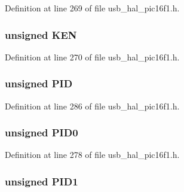 Definition at line 269 of file usb\+\_\+hal\+\_\+pic16f1.\+h.

\hypertarget{union___b_d___s_t_a_t_aaf39e9ac8929e7da9cb427f1b0de0934}{}
\subsubsection[{K\+E\+N}]{\setlength{\rightskip}{0pt plus 5cm}unsigned K\+E\+N}\label{union___b_d___s_t_a_t_aaf39e9ac8929e7da9cb427f1b0de0934}


Definition at line 270 of file usb\+\_\+hal\+\_\+pic16f1.\+h.

\hypertarget{union___b_d___s_t_a_t_a97b41b25e06fd7857dcc6217c160a8ad}{}
\subsubsection[{P\+I\+D}]{\setlength{\rightskip}{0pt plus 5cm}unsigned P\+I\+D}\label{union___b_d___s_t_a_t_a97b41b25e06fd7857dcc6217c160a8ad}


Definition at line 286 of file usb\+\_\+hal\+\_\+pic16f1.\+h.

\hypertarget{union___b_d___s_t_a_t_a810a2f6d15fc42c5d1e610b6e927d2eb}{}
\subsubsection[{P\+I\+D0}]{\setlength{\rightskip}{0pt plus 5cm}unsigned P\+I\+D0}\label{union___b_d___s_t_a_t_a810a2f6d15fc42c5d1e610b6e927d2eb}


Definition at line 278 of file usb\+\_\+hal\+\_\+pic16f1.\+h.

\hypertarget{union___b_d___s_t_a_t_acefd8c6eba334031c18cd877dfe08bfb}{}
\subsubsection[{P\+I\+D1}]{\setlength{\rightskip}{0pt plus 5cm}unsigned P\+I\+D1}\label{union___b_d___s_t_a_t_acefd8c6eba334031c18cd877dfe08bfb}


